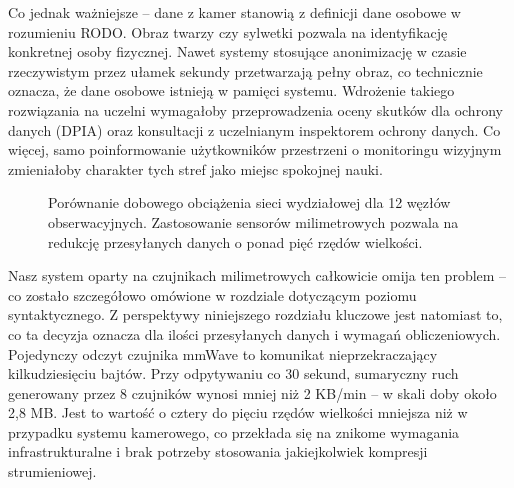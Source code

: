 \documentclass[14pt,a4paper]{extarticle}
\begin{document}
Co jednak ważniejsze -- dane z kamer stanowią z definicji dane osobowe w rozumieniu RODO. Obraz twarzy czy sylwetki pozwala na identyfikację konkretnej osoby fizycznej. Nawet systemy stosujące anonimizację w czasie rzeczywistym przez ułamek sekundy przetwarzają pełny obraz, co technicznie oznacza, że dane osobowe istnieją w pamięci systemu. Wdrożenie takiego rozwiązania na uczelni wymagałoby przeprowadzenia oceny skutków dla ochrony danych (DPIA) oraz konsultacji z uczelnianym inspektorem ochrony danych. Co więcej, samo poinformowanie użytkowników przestrzeni o monitoringu wizyjnym zmieniałoby charakter tych stref jako miejsc spokojnej nauki.
\begin{figure}[H]
    \centering
    \caption{Porównanie dobowego obciążenia sieci wydziałowej dla 12 węzłów obserwacyjnych. Zastosowanie sensorów milimetrowych pozwala na redukcję przesyłanych danych o ponad pięć rzędów wielkości.}
    \label{fig:transfer_porownanie}
\end{figure}
Nasz system oparty na czujnikach milimetrowych całkowicie omija ten problem -- co zostało szczegółowo omówione w rozdziale dotyczącym poziomu syntaktycznego. Z perspektywy niniejszego rozdziału kluczowe jest natomiast to, co ta decyzja oznacza dla ilości przesyłanych danych i wymagań obliczeniowych. Pojedynczy odczyt czujnika mmWave to komunikat nieprzekraczający kilkudziesięciu bajtów. Przy odpytywaniu co 30 sekund, sumaryczny ruch generowany przez 8 czujników wynosi mniej niż 2 KB/min -- w skali doby około 2,8 MB. Jest to wartość o cztery do pięciu rzędów wielkości mniejsza niż w przypadku systemu kamerowego, co przekłada się na znikome wymagania infrastrukturalne i brak potrzeby stosowania jakiejkolwiek kompresji strumieniowej.
\end{document}
